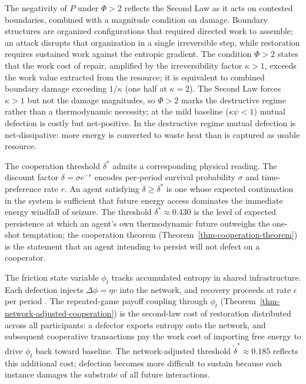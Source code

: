 \documentclass[11pt]{article}
\theoremstyle{plain}
\theoremstyle{definition}
\theoremstyle{remark}
\begin{document}
The negativity of \(P\) under \(\Phi > 2\) reflects the Second Law as it
acts on contested boundaries, combined with a magnitude condition on
damage. Boundary structures are organized configurations that required
directed work to assemble; an attack disrupts that organization in a
single irreversible step, while restoration requires sustained work
against the entropic gradient. The condition \(\Phi > 2\) states that
the work cost of repair, amplified by the irreversibility factor
\(\kappa > 1\), exceeds the work value extracted from the resource; it
is equivalent to combined boundary damage exceeding \(1/\kappa\) (one
half at \(\kappa = 2\)). The Second Law forces \(\kappa > 1\) but not
the damage magnitudes, so \(\Phi > 2\) marks the destructive regime
rather than a thermodynamic necessity; at the mild baseline
(\(\kappa\psi < 1\)) mutual defection is costly but net-positive. In the
destructive regime mutual defection is net-dissipative: more energy is
converted to waste heat than is captured as usable resource.

The cooperation threshold \(\delta^*\) admits a corresponding physical
reading. The discount factor \(\delta = \sigma e^{-r}\) encodes
per-period survival probability \(\sigma\) and time-preference rate
\(r\). An agent satisfying \(\delta \geq \delta^*\) is one whose
expected continuation in the system is sufficient that future energy
access dominates the immediate energy windfall of seizure. The threshold
\(\delta^* \approx 0.430\) is the level of expected persistence at which
an agent's own thermodynamic future outweighs the one-shot temptation;
the cooperation theorem (Theorem~\ref{thm-cooperation-theorem}) is the
statement that an agent intending to persist will not defect on a
cooperator.

The friction state variable \(\phi_t\) tracks accumulated entropy in
shared infrastructure. Each defection injects \(\Delta\phi = \eta v\)
into the network, and recovery proceeds at rate \(\epsilon\) per period
\citep{TC-IV}. The repeated-game payoff coupling through \(\phi_t\)
(Theorem~\ref{thm-network-adjusted-cooperation}) is the second-law cost
of restoration distributed across all participants: a defector exports
entropy onto the network, and subsequent cooperative transactions pay
the work cost of importing free energy to drive \(\phi_t\) back toward
baseline. The network-adjusted threshold
\(\tilde{\delta}^* \approx 0.185\) reflects this additional cost;
defection becomes more difficult to sustain because each instance
damages the substrate of all future interactions.
\end{document}

